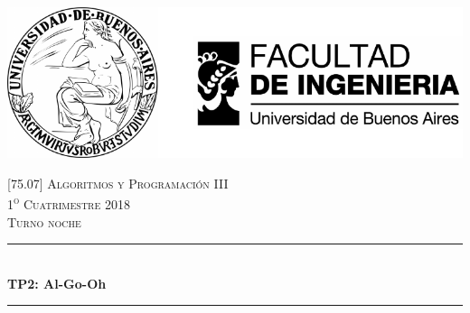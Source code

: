 

	\pagestyle{fancy}
	\begin{titlepage}
		\newcommand{\HRule}{\rule{\linewidth}{0.5mm}} %
		\center %
		
		\thispagestyle{empty}
		\begin{center}
			\includegraphics[scale=1]{includes/banner_fiuba.pdf}\\
		\end{center}
		
		
		\textsc{\LARGE \textsc{[75.07] Algoritmos y Programación III}}
		\\[0.5cm]
		\textsc{\large 1\textsuperscript{o} Cuatrimestre 2018}
		\\[0.5cm]
		\textsc{\large Turno noche}
		\\[0.5cm]
		
		\HRule
		\\[0.5cm]
		{\huge\bfseries TP2: Al-Go-Oh}
		\\[0.2cm]
		\HRule
		\\[0.5cm]
		

\end{titlepage}

